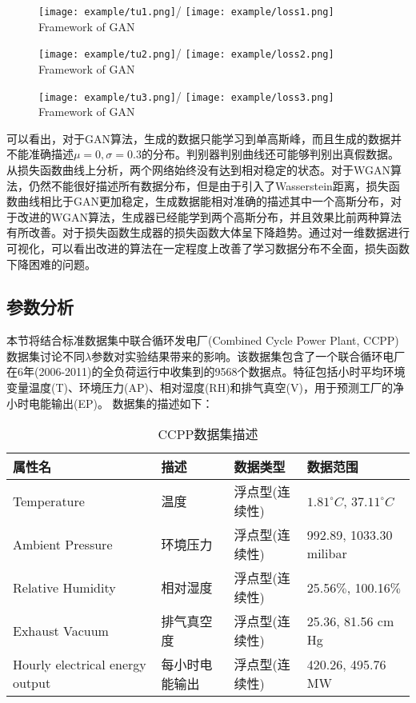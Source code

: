\begin{figure}[!htp]
	\centering
	\texttt{[image: example/tu1.png]}/
	\hspace{2cm}
	\texttt{[image: example/loss1.png]}
	{Framework of GAN}
	\label{fig:al1}
\end{figure}
\begin{figure}[!htp]
	\centering
	\texttt{[image: example/tu2.png]}/
	\hspace{2cm}
	\texttt{[image: example/loss2.png]}
	{Framework of GAN}
	\label{fig:al2}
\end{figure}
\begin{figure}[!htp]
	\centering
	\texttt{[image: example/tu3.png]}/
	\hspace{2cm}
	\texttt{[image: example/loss3.png]}
	{Framework of GAN}
	\label{fig:al3}
\end{figure}
可以看出，对于GAN算法，生成的数据只能学习到单高斯峰，而且生成的数据并不能准确描述$\mu=0,\sigma=0.3$的分布。判别器判别曲线还可能够判别出真假数据。从损失函数曲线上分析，两个网络始终没有达到相对稳定的状态。对于WGAN算法，仍然不能很好描述所有数据分布，但是由于引入了Wasserstein距离，损失函数曲线相比于GAN更加稳定，生成数据能相对准确的描述其中一个高斯分布，对于改进的WGAN算法，生成器已经能学到两个高斯分布，并且效果比前两种算法有所改善。对于损失函数生成器的损失函数大体呈下降趋势。通过对一维数据进行可视化，可以看出改进的算法在一定程度上改善了学习数据分布不全面，损失函数下降困难的问题。
\subsection{参数分析}
本节将结合标准数据集中联合循环发电厂(Combined Cycle Power Plant, CCPP)数据集讨论不同$\lambda$参数对实验结果带来的影响。该数据集包含了一个联合循环电厂在6年(2006-2011)的全负荷运行中收集到的9568个数据点。特征包括小时平均环境变量温度(T)、环境压力(AP)、相对湿度(RH)和排气真空(V)，用于预测工厂的净小时电能输出(EP)。
数据集的描述如下：
\begin{table}[!hpb]
	\centering
	\caption{CCPP数据集描述}
	\label{tabccpp}
	\begin{tabular}{llll} \toprule
		属性名   & 描述 & 数据类型&数据范围  \\  \midrule
		Temperature&温度&浮点型(连续性)&$1.81^\circ C$, $37.11^\circ C$\\
		Ambient Pressure&环境压力&浮点型(连续性)&992.89, 1033.30 milibar\\
		Relative Humidity&相对湿度&浮点型(连续性)& 25.56$\%$, 100.16$\%$ \\
		Exhaust Vacuum&排气真空度&浮点型(连续性)&25.36, 81.56 cm Hg\\
		Hourly electrical energy output&每小时电能输出&浮点型(连续性)&420.26, 495.76 MW\\ \bottomrule
	\end{tabular}
\end{table}

